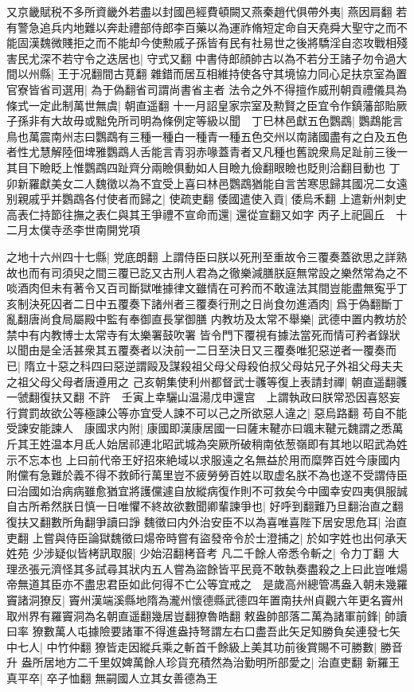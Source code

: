 又京畿賦税不多所資畿外若盡以封國邑經費頓闕又燕秦趙代俱帶外夷|{
	燕因肩翻}
若有警急追兵内地難以奔赴禮部侍郎李百藥以為運祚脩短定命自天堯舜大聖守之而不能固漢魏微賤拒之而不能却今使勲戚子孫皆有民有社易世之後將驕淫自恣攻戰相殘害民尤深不若守令之迭居也|{
	守式又翻}
中書侍郎顔帥古以為不若分王諸子勿令過大間以州縣|{
	王于况翻間古莧翻}
雜錯而居互相維持使各守其境協力同心足扶京室為置官寮皆省司選用|{
	為于偽翻省司謂尚書省主者}
法令之外不得擅作威刑朝貢禮儀具為條式一定此制萬世無虞|{
	朝直遥翻}
十一月詔皇家宗室及勲賢之臣宜令作鎮藩部貽厥子孫非有大故毋或黜免所司明為條例定等級以聞　丁巳林邑獻五色鸚鵡|{
	鸚鵡能言鳥也萬震南州志曰鸚鵡有三種一種白一種青一種五色交州以南諸國盡有之白及五色者性尤慧解陸佃埤雅鸚鵡人舌能言青羽赤喙蓋青者又凡種也舊說衆鳥足趾前三後一其目下瞼眨上惟鸚鵡四趾齊分兩瞼俱動如人目瞼九儉翻眼瞼也貶則洽翻目動也}
丁卯新羅獻美女二人魏徵以為不宜受上喜曰林邑鸚鵡猶能自言苦寒思歸其國况二女遠别親戚乎并鸚鵡各付使者而歸之|{
	使疏吏翻}
倭國遣使入貢|{
	倭烏禾翻}
上遣新州刺史高表仁持節往撫之表仁與其王爭禮不宣命而還|{
	還從宣翻又如字}
丙子上祀圓丘　十二月太僕寺丞李世南開党項

之地十六州四十七縣|{
	党底朗翻}
上謂侍臣曰朕以死刑至重故令三覆奏蓋欲思之詳熟故也而有司須臾之間三覆已訖又古刑人君為之徹樂減膳朕庭無常設之樂然常為之不啖酒肉但未有著令又百司斷獄唯據律文雖情在可矜而不敢違法其間豈能盡無寃乎丁亥制決死囚者二日中五覆奏下諸州者三覆奏行刑之日尚食勿進酒肉|{
	爲于偽翻斷丁亂翻唐尚食局屬殿中監有奉御直長掌御膳}
内教坊及太常不舉樂|{
	武德中置内教坊於禁中有内教博士太常寺有太樂署鼓吹署}
皆令門下覆視有據法當死而情可矜者錄狀以聞由是全活甚衆其五覆奏者以決前一二日至決日又三覆奏唯犯惡逆者一覆奏而已|{
	隋立十惡之科四曰惡逆謂毆及謀殺祖父母父母殺伯叔父母姑兄子外祖父母夫夫之祖父母父母者唐遵用之}
己亥朝集使利州都督武士彠等復上表請封禪|{
	朝直遥翻彠一虢翻復扶又翻}
不許　壬寅上幸驪山温湯戊申還宫　上謂執政曰朕常恐因喜怒妄行賞罰故欲公等極諫公等亦宜受人諫不可以己之所欲惡人違之|{
	惡烏路翻}
苟自不能受諫安能諫人　康國求内附|{
	康國即漢康居國一曰薩末鞬亦曰颯末鞬元魏謂之悉萬斤其王姓温本月氐人始居祁連北昭武城為突厥所破稍南依葱嶺即有其地以昭武為姓示不忘本也}
上曰前代帝王好招來絶域以求服遠之名無益於用而糜弊百姓今康國内附儻有急難於義不得不救師行萬里豈不疲勞勞百姓以取虚名朕不為也遂不受謂侍臣曰治國如治病病雖愈猶宜將護儻遽自放縱病復作則不可救矣今中國幸安四夷俱服誠自古所希然朕日慎一日唯懼不終故欲數聞卿輩諫爭也|{
	好呼到翻難乃旦翻治直之翻復扶又翻數所角翻爭讀曰諍}
魏徵曰内外治安臣不以為喜唯喜陛下居安思危耳|{
	治直吏翻}
上嘗與侍臣論獄魏徵曰煬帝時嘗有盜發帝令於士澄捕之|{
	於如字姓也出何承天姓苑}
少涉疑似皆栲訊取服|{
	少始沼翻栲音考}
凡二千餘人帝悉令斬之|{
	令力丁翻}
大理丞張元濟怪其多試尋其狀内五人嘗為盜餘皆平民竟不敢執奏盡殺之上曰此豈唯煬帝無道其臣亦不盡忠君臣如此何得不亡公等宜戒之　是歲高州總管馮盎入朝未幾羅竇諸洞獠反|{
	竇州漢端溪縣地隋為瀧州懷德縣武德四年置南扶州貞觀六年更名竇州取州界有羅竇洞為名朝直遥翻幾居豈翻獠魯皓翻}
敕盎帥部落二萬為諸軍前鋒|{
	帥讀曰率}
獠數萬人屯據險要諸軍不得進盎持弩謂左右口盡吾此矢足知勝負矣連發七矢中七人|{
	中竹仲翻}
獠皆走因縱兵乘之斬首千餘級上美其功前後賞賜不可勝數|{
	勝音升}
盎所居地方二千里奴婢萬餘人珍貨充積然為治勤明所部愛之|{
	治直吏翻}
新羅王真平卒|{
	卒子恤翻}
無嗣國人立其女善德為王

